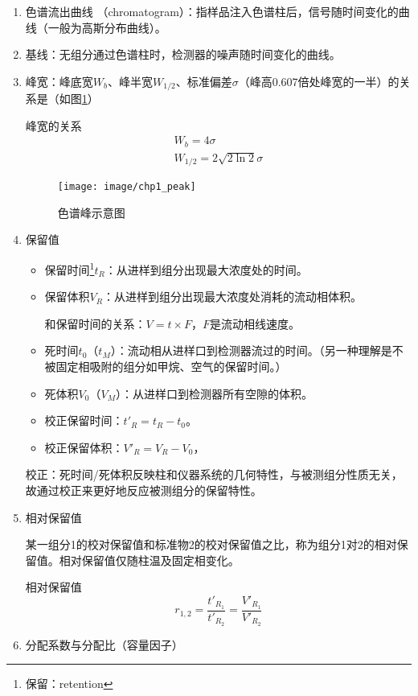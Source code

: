 \begin{enumerate}
	\item 色谱流出曲线 （chromatogram）：指样品注入色谱柱后，信号随时间变化的曲线（一般为高斯分布曲线）。
	\item 基线：无组分通过色谱柱时，检测器的噪声随时间变化的曲线。
	\item 峰宽：峰底宽$W_b$、峰半宽$W_{1/2}$、标准偏差$\sigma$（峰高0.607倍处峰宽的一半）的关系是（如图\ref{fig:chp1peak}）
	\begin{theorem*}{峰宽的关系}{}
		\begin{gather*}
			W_b=4\sigma\\
			W_{1/2}=2\sqrt{2\ln 2}\sigma
		\end{gather*}
	\end{theorem*}
	\begin{figure}[!h]
		\centering
		\texttt{[image: image/chp1\_peak]}
		\caption{色谱峰示意图}
		\label{fig:chp1peak}
	\end{figure}
	\item 保留值
	\begin{itemize}
		\item 保留时间\footnote{保留：retention}$t_R$：从进样到组分出现最大浓度处的时间。
		\item 保留体积$V_R$：从进样到组分出现最大浓度处消耗的流动相体积。
		
		和保留时间的关系：$V=t\times F$，$F$是流动相线速度。
		\item 死时间$t_0$（$t_M$）：流动相从进样口到检测器流过的时间。（另一种理解是不被固定相吸附的组分如甲烷、空气的保留时间。）
		\item 死体积$V_0$（$V_M$）：从进样口到检测器所有空隙的体积。
		\item 校正保留时间：$t'_R=t_R- t_0$。
		\item 校正保留体积：$V'_R=V_R- V_0$，
	\end{itemize}
	
	校正：死时间/死体积反映柱和仪器系统的几何特性，与被测组分性质无关，故通过校正来更好地反应被测组分的保留特性。
	\item 相对保留值
	
	某一组分1的校对保留值和标准物2的校对保留值之比，称为组分1对2的相对保留值。相对保留值仅随柱温及固定相变化。
	\begin{theorem*}{相对保留值}{}
		\begin{equation*}
			r_{1,2}=\dfrac{t'_{R_1}}{t'_{R_2}}=\dfrac{V'_{R_1}}{V'_{R_2}}
		\end{equation*}
	\end{theorem*}
	\item 分配系数与分配比（容量因子）
	

\end{enumerate}
